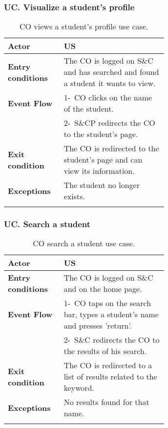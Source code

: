 \subsubsection*{UC\cuc . Visualize a student's profile}
\begin{center}
    \begin{longtable}{|l|p{0.65\linewidth}|}
        \hline
        \textbf{Actor}            & US \\
        \hline
        \textbf{Entry conditions} & The CO is logged on S\&C and has searched and found a student it wants to view. \\
        \hline
        \textbf{Event Flow}       & 1-\ CO clicks on the name of the student.  \\
        & 2-\ S\&CP redirects the CO to the student's page.\\
        \hline
        \textbf{Exit condition}   &  The CO is redirected to the student's page and can view its information.\\
        \hline
        \textbf{Exceptions}       & The student no longer exists. \\
        \hline
        \caption{CO views a student's profile use case.}
        \label{tab: cp_use_case}
    \end{longtable}
\end{center}

\subsubsection*{UC\cuc . Search a student}
\begin{center}
    \begin{longtable}{|l|p{0.65\linewidth}|}
        \hline
        \textbf{Actor}            & US \\
        \hline
        \textbf{Entry conditions} & The CO is logged on S\&C and on the home page. \\
        \hline
        \textbf{Event Flow}       & 1-\ CO taps on the search bar, types a student's name and presses 'return'.  \\
        & 2-\ S\&C redirects the CO to the results of his search.\\
        \hline
        \textbf{Exit condition}   &  The CO is redirected to a list of results related to the keyword. \\
        \hline
        \textbf{Exceptions}       & No results found for that name. \\
        \hline
        \caption{CO search a student use case.}
        \label{tab: cp_use_case}
    \end{longtable}
\end{center}


